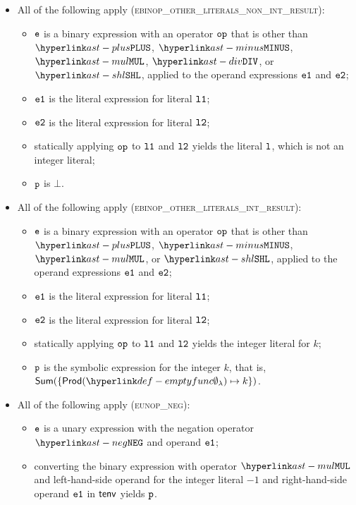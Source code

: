 \begin{itemize}
  \item All of the following apply (\textsc{ebinop\_other\_literals\_non\_int\_result}):
  \begin{itemize}
    \item $\texttt{e}$ is a binary expression with an operator $\texttt{op}$ that is other than $\PLUS$, $\MINUS$, $\MUL$, $\DIV$, or $\SHL$,
          applied to the operand expressions $\texttt{e1}$ and $\texttt{e2}$;
    \item $\texttt{e1}$ is the literal expression for literal $\texttt{l1}$;
    \item $\texttt{e2}$ is the literal expression for literal $\texttt{l2}$;
    \item statically applying $\texttt{op}$ to $\texttt{l1}$ and $\texttt{l2}$ yields the literal $\texttt{l}$, which is not an integer literal;
    \item $\texttt{p}$ is $\bot$.
  \end{itemize}

  \item All of the following apply (\textsc{ebinop\_other\_literals\_int\_result}):
  \begin{itemize}
    \item $\texttt{e}$ is a binary expression with an operator $\texttt{op}$ that is other than $\PLUS$, $\MINUS$, $\MUL$, or $\SHL$,
          applied to the operand expressions $\texttt{e1}$ and $\texttt{e2}$;
    \item $\texttt{e1}$ is the literal expression for literal $\texttt{l1}$;
    \item $\texttt{e2}$ is the literal expression for literal $\texttt{l2}$;
    \item statically applying $\texttt{op}$ to $\texttt{l1}$ and $\texttt{l2}$ yields the integer literal for $k$;
    \item $\texttt{p}$ is the symbolic expression for the integer $k$, that is, $\Sum( \{ \Prod(\emptyfunc)\mapsto k \} )$.
  \end{itemize}

  \item All of the following apply (\textsc{eunop\_neg}):
  \begin{itemize}
    \item $\texttt{e}$ is a unary expression with the negation operator $\NEG$ and operand $\texttt{e1}$;
    \item converting the binary expression with operator $\MUL$ and left-hand-side operand for the integer literal $-1$ and
    right-hand-side operand $\texttt{e1}$ in $\textsf{tenv}$ yields $\texttt{p}$\ProseOrTypeErrorOrBot.
  \end{itemize}


\end{itemize}
